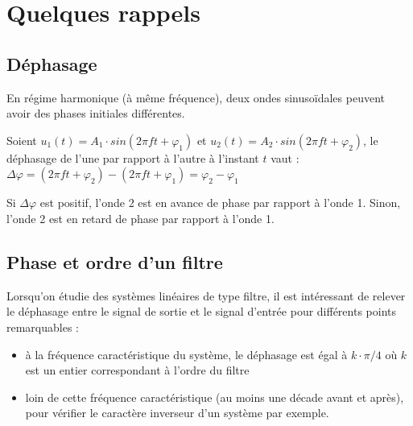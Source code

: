 \newpage
\section{Quelques rappels}
\subsection{Déphasage}

En régime harmonique (à même fréquence), deux ondes sinusoïdales peuvent avoir des phases initiales différentes.

Soient $u_1(t) = A_1 \cdot sin(2\pi f t + \varphi_1)$ et $u_2(t) = A_2 \cdot sin(2\pi f t + \varphi_2)$, le déphasage de l'une par rapport à l'autre à l'instant $t$ vaut : $\Delta\varphi = (2\pi f t + \varphi_2) - (2\pi f t + \varphi_1) = \varphi_2 - \varphi_1$

\medskip

Si $\Delta\varphi$ est positif, l'onde 2 est en avance de phase par rapport à l'onde 1. Sinon, l'onde 2 est en retard de phase par rapport à l'onde 1.

\subsection{Phase et ordre d'un filtre}

Lorsqu'on étudie des systèmes linéaires de type filtre, il est intéressant de relever le déphasage entre le signal de sortie et le signal d'entrée pour différents points remarquables :

\begin{itemize}
	\item à la fréquence caractéristique du système, le déphasage est égal à $k\cdot \pi/4$ où $k$ est un entier correspondant à l'ordre du filtre
	\item loin de cette fréquence caractéristique (au moins une décade avant et après), pour vérifier le caractère inverseur d'un système par exemple.
\end{itemize}
